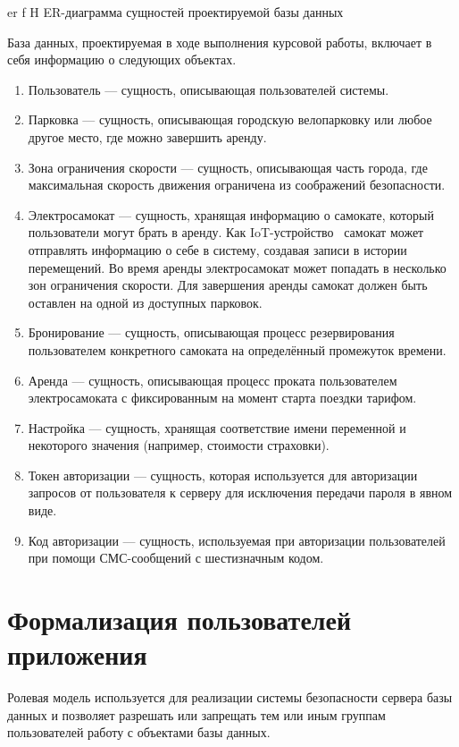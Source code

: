     {er}
    {f}
    {H}
    {\textwidth}
    {ER-диаграмма сущностей проектируемой базы данных}

База данных, проектируемая в ходе выполнения курсовой работы, включает в себя информацию о следующих объектах.

\begin{enumerate}
    \item Пользователь --- сущность, описывающая пользователей системы.
    \item Парковка --- сущность, описывающая городскую велопарковку или любое другое место, где можно завершить аренду.
    \item Зона ограничения скорости --- сущность, описывающая часть города, где максимальная скорость движения ограничена из соображений безопасности.
    \item Электросамокат --- сущность, хранящая информацию о самокате, который пользователи могут брать в аренду. Как IoT-устройство~\cite{iot} самокат может отправлять информацию о себе в систему, создавая записи в истории перемещений. Во время аренды электросамокат может попадать в несколько зон ограничения скорости. Для завершения аренды самокат должен быть оставлен на одной из доступных парковок.
    \item Бронирование --- сущность, описывающая процесс резервирования пользователем конкретного самоката на определённый промежуток времени.
    \item Аренда --- сущность, описывающая процесс проката пользователем электросамоката с фиксированным на момент старта поездки тарифом.
    \item Настройка --- сущность, хранящая соответствие имени переменной и некоторого значения (например, стоимости страховки).
    \item Токен авторизации --- сущность, которая используется для авторизации запросов от пользователя к серверу для исключения передачи пароля в явном виде.
    \item Код авторизации --- сущность, используемая при авторизации пользователей при помощи СМС-сообщений с шестизначным кодом.
\end{enumerate}

\section{Формализация пользователей приложения}

Ролевая модель используется для реализации системы безопасности сервера базы данных и позволяет разрешать или запрещать тем или иным группам пользователей работу с объектами базы данных.

